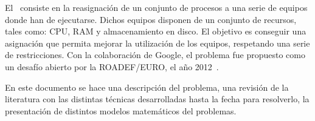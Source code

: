 \documentclass[../informe2.tex]{subfiles}
\begin{document}
El \mrp\ consiste en la reasignación de un conjunto de procesos a una serie de equipos donde han de ejecutarse. Dichos equipos disponen de un conjunto de recursos, tales como: CPU, RAM y almacenamiento en disco. El objetivo es conseguir una asignación que permita mejorar la utilización de los equipos, respetando una serie de restricciones. Con la colaboración de Google, el problema fue propuesto como un desafío abierto por la ROADEF/EURO, el año 2012~\cite{2012ProblemDefinition}. \par
\noindent En este documento se hace una descripción del problema, una revisión de la literatura con las distintas técnicas desarrolladas hasta la fecha para resolverlo, la presentación de distintos modelos matemáticos del problemas.
\end{document}
